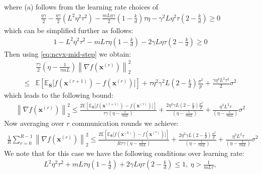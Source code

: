 \documentclass[review,onefignum,onetabnum]{siamart190516}
\begin{document}
where (a) follows from the learning rate choices of 
\begin{align}
    \frac{\eta\gamma}{2}-\frac{\eta\gamma}{2}\left(L^2\eta^2\tau^2\right)-\frac{mL\eta\gamma}{2}\left(1-\frac{k}{d}\right)\tau\eta-\gamma^2 L\eta^2\tau\left(2-\frac{k}{d}\right)\geq 0
\end{align}
which can be simplified further as follows:
\begin{align}
    1-L^2\eta^2\tau^2-mL\tau\eta\left(1-\frac{k}{d}\right)-2\gamma L\eta\tau\left(2-\frac{k}{d}\right)\geq 0
\end{align}
Then using \ref{eq:ncvx-mid-step} we obtain:
\begin{align}
  &\frac{\tau\gamma}{2} \left({\eta}-\frac{1}{\tau mL}\right)\left\|\nabla f({\boldsymbol{x}}^{(r)})\right\|_2^2\\
  \leq& \mathbb{E}\left[\mathbb{E}_\mathbf{S}\Big[f({\boldsymbol{x}}^{(r+1)})-f({\boldsymbol{x}}^{(r)})\Big]\right]+\tau\eta^2\gamma^2 L\left(2-\frac{k}{d}\right)\frac{\sigma^2}{p}+\frac{\gamma\eta^3L^2\tau^2}{2}\sigma^2
\end{align}
which leads to the following bound:
\begin{align}
     \left\|\nabla f({\boldsymbol{x}}^{(r)})\right\|_2^2\leq \frac{2 \mathbb{E}\left[\mathbb{E}_\mathbf{S}\Big[f({\boldsymbol{x}}^{(r+1)})-f({\boldsymbol{x}}^{(r)})\Big]\right]}{\tau \gamma \left({\eta}-\frac{1}{\tau mL}\right)}+\frac{2\eta^2\gamma L\left(2-\frac{k}{d}\right)\frac{\sigma^2}{p}}{ \left({\eta}-\frac{1}{\tau mL}\right)}+\frac{\eta^3L^2\tau}{\left({\eta}-\frac{1}{\tau mL}\right)}\sigma^2 
\end{align}
Now averaging over $r$ communication rounds we achieve:
\begin{align}
    \frac{1}{R}\sum_{r=0}^{R-1}\left\|\nabla f({\boldsymbol{x}}^{(r)})\right\|_2^2\leq \frac{2 \mathbb{E}\left[\mathbb{E}_\mathbf{S}\Big[f({\boldsymbol{x}}^{(0)})-f({\boldsymbol{x}}^{(*)})\Big]\right]}{R\tau \gamma \left({\eta}-\frac{1}{\tau mL}\right)}+\frac{2\eta^2\gamma L\left(2-\frac{k}{d}\right)\frac{\sigma^2}{p}}{ \left({\eta}-\frac{1}{\tau mL}\right)}+\frac{\eta^3L^2\tau}{\left({\eta}-\frac{1}{\tau mL}\right)}\sigma^2 
\end{align}
We note that for this case we have the following conditions over learning rate:
\begin{align}
    L^2\eta^2\tau^2+mL\tau\eta\left(1-\frac{k}{d}\right)+2\gamma L\eta\tau\left(2-\frac{k}{d}\right)\leq 1,\:\eta> \frac{1}{mL\tau},
\end{align}
\end{document}
